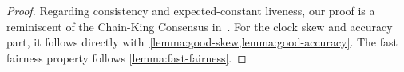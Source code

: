 \begin{proof}
    Regarding consistency and expected-constant liveness, our proof is a reminiscent of the Chain-King Consensus in~\cite{EC:GarKiaShe24}.
    For the clock skew and accuracy part, it follows directly with~\cref{lemma:good-skew,lemma:good-accuracy}.
    The fast fairness property follows \cref{lemma:fast-fairness}.
\end{proof}

